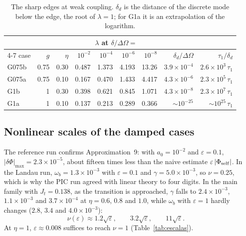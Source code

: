 \documentclass[11pt,a4paper]{article}
\begin{document}
\begin{table}[!htbp]
\centering
\small
\begin{tabular}{lrrrrrrrr}
\toprule
 & & & \multicolumn{4}{c}{$\lambda$ at $\delta/\Delta\Omega=$} & & \\
\cmidrule(lr){4-7}
case & $g$ & $\eta$ & $10^{-2}$ & $10^{-4}$ & $10^{-6}$ & $10^{-8}$ & $\delta_d/\Delta\Omega$ & $\tau_1/\delta_d$\\
\midrule
G075b & 0.75 & 0.30 & 0.487 & 1.373 & 4.193 & 13.26 & $3.9\times10^{-4}$ & $2.6\times10^{3}\,\tau_1$\\
G075a & 0.75 & 0.10 & 0.167 & 0.470 & 1.433 & 4.417 & $4.3\times10^{-6}$ & $2.3\times10^{5}\,\tau_1$\\
G1b & 1 & 0.30 & 0.398 & 0.621 & 0.845 & 1.071 & $4.3\times10^{-8}$ & $2.3\times10^{7}\,\tau_1$\\
G1a & 1 & 0.10 & 0.137 & 0.213 & 0.289 & 0.366 & $\sim10^{-25}$ & $\sim10^{25}\,\tau_1$\\
\bottomrule
\end{tabular}
\caption{The sharp edges at weak coupling. $\delta_d$ is the distance of the discrete mode below the
edge, the root of $\lambda=1$; for G1a it is an extrapolation of the logarithm.}
\label{tab:lazo_debil}
\end{table}

\subsection{Nonlinear scales of the damped cases}
\label{sec:res_escalas}

The reference run confirms Approximation~9: with $a_0=10^{-2}$ and $\varepsilon=0.1$,
$|\delta\Phi|_{\max}=2.3\times10^{-5}$, about fifteen times less than the naive estimate
$\varepsilon\,|\Phi_{\rm self}|$. In the Landau run, $\omega_b=1.3\times10^{-3}$ with $\varepsilon=0.1$ and
$\gamma=5.0\times10^{-3}$, so $\nu=0.25$, which is why the PIC run agreed with linear theory to four
digits. In the main family with $J_t=0.138$, as the transition is approached, $\gamma$ falls to
$2.4\times10^{-3}$, $1.1\times10^{-3}$ and $3.7\times10^{-4}$ at $\eta=0.6$, $0.8$ and $1.0$, while $\omega_b$ with
$\varepsilon=1$ hardly changes ($2.8$, $3.4$ and $4.0\times10^{-3}$):
\[
  \nu(\varepsilon)\approx1.2\sqrt\varepsilon,\qquad 3.2\sqrt\varepsilon,\qquad 11\sqrt\varepsilon .
\]
At $\eta=1$, $\varepsilon\approx0.008$ suffices to reach $\nu=1$ (Table~\ref{tab:escalas}).
\end{document}
